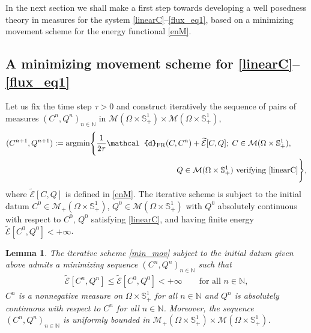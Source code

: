 \documentclass{article}
\numberwithin{equation}{section}
\newtheorem{lemma}{Lemma}%
\newcommand{\N}{\mathbb{N}}
\newcommand{\argmin}[0]{\operatorname{argmin}}
\begin{document}
In the next section we shall make a first step towards developing a well posedness theory in measures
for the system \eqref{linearC}--\eqref{flux_eq1}, based on a minimizing movement scheme for the energy functional \eqref{enM}.


\subsection{A minimizing movement scheme for \eqref{linearC}--\eqref{flux_eq1}}\label{sec:min_mov}
Let us fix the time step $\tau>0$ and construct iteratively the sequence of pairs of measures $(C^n, Q^n)_{n\in\N}$
in $\mathcal{M}(\Omega\times\mathbb{S}_+^1)\times \mathcal{M}(\Omega\times\mathbb{S}_+^1)$,
\begin{align}\label{min_mov}
   (C^{n+1}, Q^{n+1}) := \argmin \Biggl\{ \frac{1}{2\tau}\mathcal{d}_\mathrm{FR} (C,C^n) + \widetilde{\mathcal{E}}[C,Q];\;
        C\in\mathcal{M}(\Omega\times\mathbb{S}_+^1),  \qquad \\
         Q\in\mathcal{M}(\Omega\times\mathbb{S}_+^1) \mbox{ verifying \eqref{linearC}} \Biggr\},  \nonumber
\end{align}
where $\widetilde{\mathcal{E}}[C,Q]$ is defined in \eqref{enM}.
The iterative scheme is subject to the initial datum $C^0\in \mathcal{M}_+(\Omega\times\mathbb{S}_+^1)$, $Q^0\in \mathcal{M}(\Omega\times\mathbb{S}_+^1)$
with $Q^0$ absolutely continuous with respect to $C^0$, $Q^0$ satisfying \eqref{linearC}, and having finite energy $\widetilde{\mathcal{E}}[C^0,Q^0] < +\infty$.
\vspace{2mm}

\begin{lemma}\label{lem:JKO}
The iterative scheme \eqref{min_mov} subject to the initial datum given above
admits a minimizing sequence $(C^n, Q^n)_{n\in\N}$ such that
\begin{align}\label{aprioriE}
   \widetilde{\mathcal{E}}[C^{n},Q^{n}] \leq \widetilde{\mathcal{E}}[C^0,Q^0] < +\infty \qquad\mbox{for all } n\in\N,
\end{align}
$C^n$ is a nonnegative measure on $\Omega\times\mathbb{S}_+^1$
for all $n\in\N$ and $Q^n$ is absolutely continuous with respect to $C^n$ for all $n\in\N$.
Moreover, the sequence $(C^n, Q^n)_{n\in\N}$ is uniformly bounded in
$\mathcal{M}_+(\Omega\times\mathbb{S}_+^1)\times \mathcal{M}(\Omega\times\mathbb{S}_+^1)$.
\end{lemma}
\end{document}
